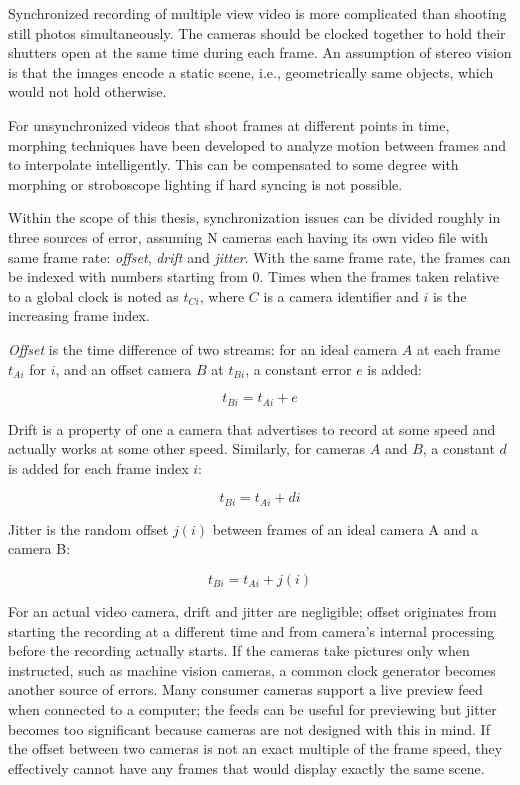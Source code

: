Synchronized recording of multiple view video is more complicated than shooting still photos simultaneously.
The cameras should be clocked together to hold their shutters open at the same time during each frame.
An assumption of stereo vision is that the images encode a static scene, i.e., geometrically same objects, which would not hold otherwise.

For unsynchronized videos that shoot frames at different points in time, morphing techniques have been developed to analyze motion between frames and to interpolate intelligently.
This can be compensated to some degree with morphing or stroboscope lighting if hard syncing is not possible. \cite{bradley2009synchronization}

Within the scope of this thesis, synchronization issues can be divided roughly in three sources of error, assuming N cameras each having its own video file with same frame rate: \emph{offset}, \emph{drift} and \emph{jitter}.
With the same frame rate, the frames can be indexed with numbers starting from 0.
Times when the frames taken relative to a global clock is noted as $t_{Ci}$, where $C$ is a camera identifier and $i$ is the increasing frame index.

\emph{Offset} is the time difference of two streams: for an ideal camera $A$ at each frame $t_{Ai}$ for $i$, and an offset camera $B$ at $t_{Bi}$, a constant error $e$ is added:

\begin{equation} \label{eq:timeoffset}
	t_{Bi} = t_{Ai} + e
\end{equation}

Drift is a property of one a camera that advertises to record at some speed and actually works at some other speed. Similarly, for cameras $A$ and $B$, a constant $d$ is added for each frame index $i$:

\begin{equation} \label{eq:timedrift}
	t_{Bi} = t_{Ai} + d i
\end{equation}

Jitter is the random offset $j(i)$ between frames of an ideal camera A and a camera B:

\begin{equation} \label{eq:timejitter}
	t_{Bi} = t_{Ai} + j(i)
\end{equation}

For an actual video camera, drift and jitter are negligible; offset originates from starting the recording at a different time and from camera's internal processing before the recording actually starts.
If the cameras take pictures only when instructed, such as machine vision cameras, a common clock generator becomes another source of errors.
Many consumer cameras support a live preview feed when connected to a computer; the feeds can be useful for previewing but jitter becomes too significant because cameras are not designed with this in mind.
If the offset between two cameras is not an exact multiple of the frame speed, they effectively cannot have any frames that would display exactly the same scene.

